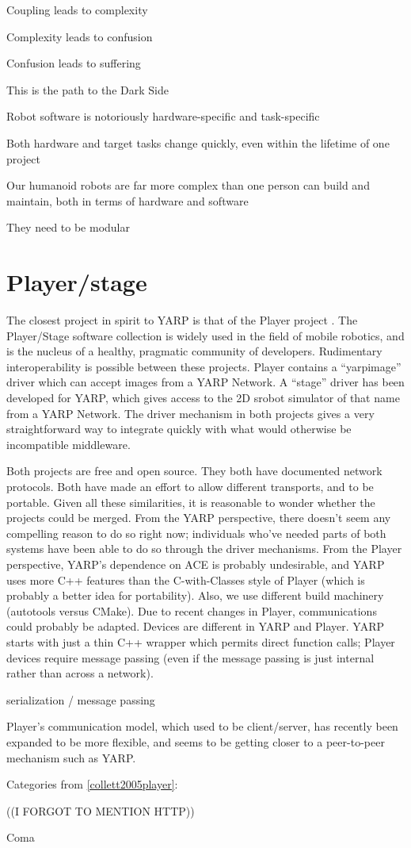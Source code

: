 Coupling leads to complexity

Complexity leads to confusion

Confusion leads to suffering

This is the path to the Dark Side

Robot software is notoriously hardware-specific and task-specific

Both hardware and target tasks change quickly, even within the
lifetime of one project

Our humanoid robots are far more complex than one person can build and
maintain, both in terms of hardware and software

They need to be modular



\section{Player/stage}

The closest project in spirit to YARP is that of the Player project
\cite{vaughan2006reusable}.  The Player/Stage software collection is 
widely used in the field of mobile robotics, and is the nucleus of
a healthy, pragmatic community of developers.  
%
Rudimentary interoperability is possible between these projects.
Player contains a ``yarpimage'' driver which can accept images
from a YARP Network.  A ``stage'' driver has been developed
for YARP, which gives access to the 2D srobot simulator of that
name from a YARP Network.
%
The driver mechanism in both projects gives a very straightforward way
to integrate quickly with what would otherwise be incompatible
middleware.

Both projects are free and open source.  They both have documented
network protocols.  Both have made an effort to allow different
transports, and to be portable.  Given all these similarities,
it is reasonable to wonder whether the projects could be merged.
%
From the YARP perspective, there doesn't seem any compelling reason to
do so right now; individuals who've needed parts of both systems have
been able to do so through the driver mechanisms.
%
From the Player perspective, YARP's dependence on ACE is probably
undesirable, and YARP uses more C++ features than the C-with-Classes
style of Player (which is probably a better idea for portability).
Also, we use different build machinery (autotools versus CMake).
%
Due to recent changes in Player, communications could probably be
adapted.  Devices are different in YARP and Player.  YARP starts
with just a thin C++ wrapper which permits direct function calls;
Player devices require message passing (even if the message passing
is just internal rather than across a network).


serialization / message passing

Player's communication model,
which used to be client/server, has recently been expanded to
be more flexible, and seems to be getting closer to a peer-to-peer
mechanism such as YARP.



Categories from \ref{collett2005player}:


((I FORGOT TO MENTION HTTP))


Coma
